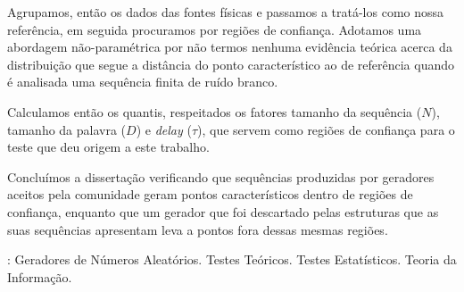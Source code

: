 \documentclass[tcc]{ic}
\begin{document}
\begin{resumo}
Agrupamos, então os dados das fontes físicas e passamos a tratá-los como nossa referência, em seguida procuramos por regiões de confiança. 
Adotamos uma abordagem não-paramétrica por não termos nenhuma evidência teórica acerca da distribuição que segue a distância do ponto característico ao de referência quando é analisada uma sequência finita de ruído branco.

Calculamos então os quantis, respeitados os fatores tamanho da sequência ($N$), tamanho da palavra ($D$) e \textit{delay} ($\tau$), que servem como regiões de confiança para o teste que deu origem a este trabalho.

Concluímos a dissertação verificando que sequências produzidas por geradores aceitos pela comunidade geram pontos característicos dentro de regiões de confiança, enquanto que um gerador que foi descartado pelas estruturas que as suas sequências apresentam leva a pontos fora dessas mesmas regiões.

\vspace{1em}
: Geradores de Números Aleatórios. Testes Teóricos. Testes Estatísticos. Teoria da Informação.
\end{resumo}
\end{document}
